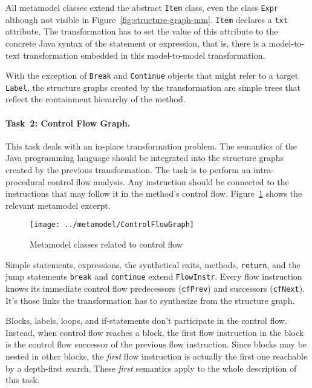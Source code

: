 \documentclass[submission]{eptcs}
\begin{document}
All metamodel classes extend the abstract \verb|Item| class, even the class
\verb|Expr| although not visible in Figure~\ref{fig:structure-graph-mm}.
\verb|Item| declares a \verb|txt| attribute.  The transformation has to set the
value of this attribute to the concrete Java syntax of the statement or
expression, that is, there is a model-to-text transformation embedded in this
model-to-model transformation.

With the exception of \verb|Break| and \verb|Continue| objects that might refer
to a target \verb|Label|, the structure graphs created by the transformation
are simple trees that reflect the containment hierarchy of the method.

\paragraph{Task~2: Control Flow Graph.}
\label{sec:task2-cf-graph}

This task deals with an in-place transformation problem.  The semantics of the
Java programming language should be integrated into the structure graphs
created by the previous transformation.  The task is to perform an
intra-procedural control flow analysis.  Any instruction should be connected to
the instructions that may follow it in the method's control flow.
Figure~\ref{fig:control-flow-mm} shows the relevant metamodel excerpt.

\begin{figure}[h!]
  \centering
  \texttt{[image: ../metamodel/ControlFlowGraph]}
  \caption{Metamodel classes related to control flow}
  \label{fig:control-flow-mm}
\end{figure}

Simple statements, expressions, the synthetical exits, methods, \verb|return|,
and the jump statements \verb|break| and \verb|continue| extend
\verb|FlowInstr|.  Every flow instruction knows its immediate control flow
predecessors (\verb|cfPrev|) and successors (\verb|cfNext|).  It's those links
the transformation has to synthesize from the structure graph.

Blocks, labels, loops, and if-statements don't participate in the control flow.
Instead, when control flow reaches a block, the first flow instruction in the
block is the control flow successor of the previous flow instruction.  Since
blocks may be nested in other blocks, the \emph{first} flow instruction is
actually the first one reachable by a depth-first search.  These \emph{first}
semantics apply to the whole description of this task.
\end{document}
